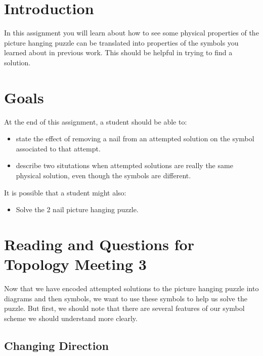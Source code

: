 \documentclass[12pt,letterpaper]{article}
\theoremstyle{definition}
\begin{document}
\setlength{\parskip}{1ex plus 0.5ex minus 0.2ex}
\setlength{\parindent}{0pt}

\pagestyle{fancy}
\cfoot{}

\section*{Introduction}
In this assignment you will learn about how to see some physical properties of the picture hanging puzzle can be translated into properties of the symbols you learned about in previous work.
This should be helpful in trying to find a solution.

\section*{Goals}
At the end of this assignment, a student should be able to:
\begin{itemize}
\item state the effect of removing a nail from an attempted solution on the symbol associated to that attempt.
\item describe two situtations when attempted solutions are really the same physical solution, even though the symbols are different.
\end{itemize}
It is possible that a student might also:
\begin{itemize}
\item Solve the 2 nail picture hanging puzzle.
\end{itemize}

\section*{Reading and Questions for Topology Meeting 3}

Now that we have encoded attempted solutions to the picture hanging puzzle into diagrams and then symbols, we want to use these symbols to help us solve the puzzle.
But first, we should note that there are several features of our symbol scheme we should understand more clearly.

\subsection*{Changing Direction}
\end{document}
